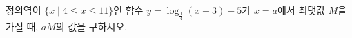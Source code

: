 정의역이 $\{x \mid 4\le x\le 11\}$인 함수 $y=\log_{\frac{1}{4}} (x-3)+5$가 $x=a$에서 최댓값 $M$을 가질 때, $aM$의 값을 구하시오.
